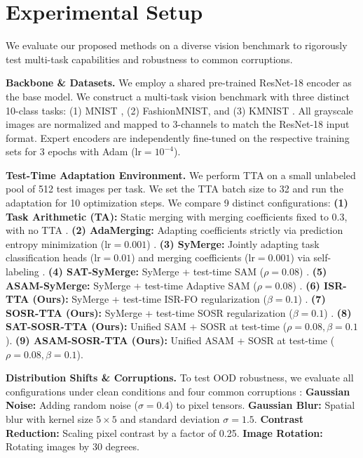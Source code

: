 \documentclass{article}
\theoremstyle{plain}
\theoremstyle{definition}
\theoremstyle{remark}
\begin{document}
\section{Experimental Setup}
\label{sec:setup}
We evaluate our proposed methods on a diverse vision benchmark to rigorously test multi-task capabilities and robustness to common corruptions.

\textbf{Backbone \& Datasets.} We employ a shared pre-trained ResNet-18 encoder as the base model. We construct a multi-task vision benchmark with three distinct 10-class tasks: (1) MNIST \cite{krizhevsky2009learning}, (2) FashionMNIST, and (3) KMNIST \cite{netzer2011reading}. All grayscale images are normalized and mapped to 3-channels to match the ResNet-18 input format. Expert encoders are independently fine-tuned on the respective training sets for 3 epochs with Adam ($\text{lr} = 10^{-4}$).

\textbf{Test-Time Adaptation Environment.} We perform TTA on a small unlabeled pool of 512 test images per task. We set the TTA batch size to 32 and run the adaptation for 10 optimization steps. We compare 9 distinct configurations:
\textbf{(1) Task Arithmetic (TA):} Static merging with merging coefficients fixed to 0.3, with no TTA \cite{ilharco2022editing}.
\textbf{(2) AdaMerging:} Adapting coefficients strictly via prediction entropy minimization ($\text{lr} = 0.001$) \cite{yang2024adamerging}.
\textbf{(3) SyMerge:} Jointly adapting task classification heads ($\text{lr} = 0.01$) and merging coefficients ($\text{lr} = 0.001$) via self-labeling \cite{jung2025symerge}.
\textbf{(4) SAT-SyMerge:} SyMerge + test-time SAM ($\rho = 0.08$) \cite{foret2021sharpness,marczak2025sharpness}.
\textbf{(5) ASAM-SyMerge:} SyMerge + test-time Adaptive SAM ($\rho = 0.08$) \cite{kwon2021asam}.
\textbf{(6) ISR-TTA (Ours):} SyMerge + test-time ISR-FO regularization ($\beta = 0.1$) \cite{panariello2025accurate}.
\textbf{(7) SOSR-TTA (Ours):} SyMerge + test-time SOSR regularization ($\beta = 0.1$) \cite{stoica2025knots}.
\textbf{(8) SAT-SOSR-TTA (Ours):} Unified SAM + SOSR at test-time ($\rho = 0.08, \beta = 0.1$).
\textbf{(9) ASAM-SOSR-TTA (Ours):} Unified ASAM + SOSR at test-time ($\rho = 0.08, \beta = 0.1$).

\textbf{Distribution Shifts \& Corruptions.} To test OOD robustness, we evaluate all configurations under clean conditions and four common corruptions \cite{hendrycks2019benchmarking}:
\textbf{Gaussian Noise:} Adding random noise ($\sigma = 0.4$) to pixel tensors.
\textbf{Gaussian Blur:} Spatial blur with kernel size $5 \times 5$ and standard deviation $\sigma = 1.5$.
\textbf{Contrast Reduction:} Scaling pixel contrast by a factor of 0.25.
\textbf{Image Rotation:} Rotating images by 30 degrees.
\end{document}
